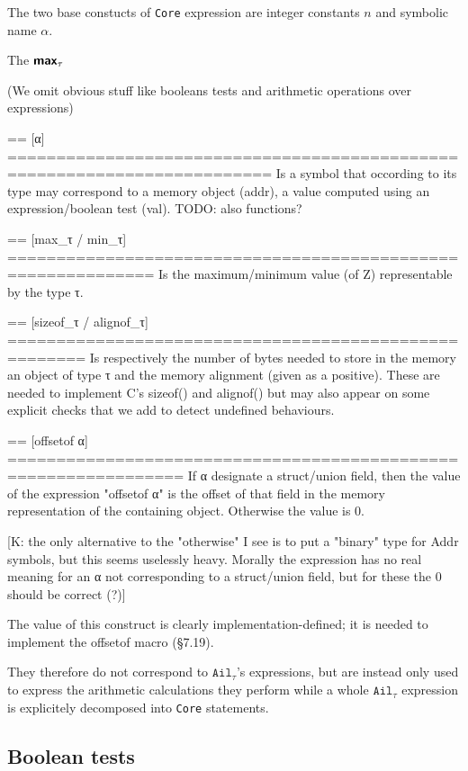 \documentclass[12pt, a4paper]{article}
\newcommand{\textbm}[1]{\textbf{\textsf{#1}}} %
\newcommand{\TODO}[1]{{\color{red} #1}}
\newcommand{\core}{\texttt{Core}}
\newcommand{\ailtau}{$\texttt{Ail}_\tau$}
\begin{document}
\ottgrammartabular{
  \ottcoreXXeop\ottinterrule
  \ottcoreXXe\ottafterlastrule
}

The two base constucts of \core{} expression are integer constants $n$ and symbolic name $\alpha$. 

The $\textbm{max}_{\tau}$


\TODO{
(We omit obvious stuff like booleans tests and arithmetic operations over
 expressions)

== [α] =========================================================================
Is a symbol that occording to its type may correspond to a memory object (addr),
a value computed using an expression/boolean test (val).
TODO: also functions?

== [max\_τ / min\_τ] =============================================================
Is the maximum/minimum value (of Z) representable by the type τ.

== [sizeof\_τ / alignof\_τ] ======================================================
Is respectively the number of bytes needed to store in the memory an object of
type τ and the memory alignment (given as a positive). These are needed to
implement C's sizeof() and alignof() but may also appear on some explicit checks
that we add to detect undefined behaviours.

== [offsetof α] ================================================================
If α designate a struct/union field, then the value of the expression "offsetof
α" is the offset of that field in the memory representation of the containing
object. Otherwise the value is 0.

[K: the only alternative to the "otherwise" I see is to put a "binary" type for
    Addr symbols, but this seems uselessly heavy. Morally the expression has no
    real meaning for an α not corresponding to a struct/union field, but for
    these the 0 should be correct (?)]

The value of this construct is clearly implementation-defined; it is needed to
implement the offsetof macro (§7.19).
}


\newpage


They therefore do not correspond to \ailtau{}'s expressions, but are instead only used to express the arithmetic calculations they perform while a whole \ailtau{} expression is explicitely decomposed into \core{} statements.


\subsection{Boolean tests}
\ottgrammartabular{
  \ottcoreXXbop\ottinterrule
  \ottcoreXXconnective\ottinterrule
  \ottcoreXXb\ottafterlastrule
}
\end{document}
